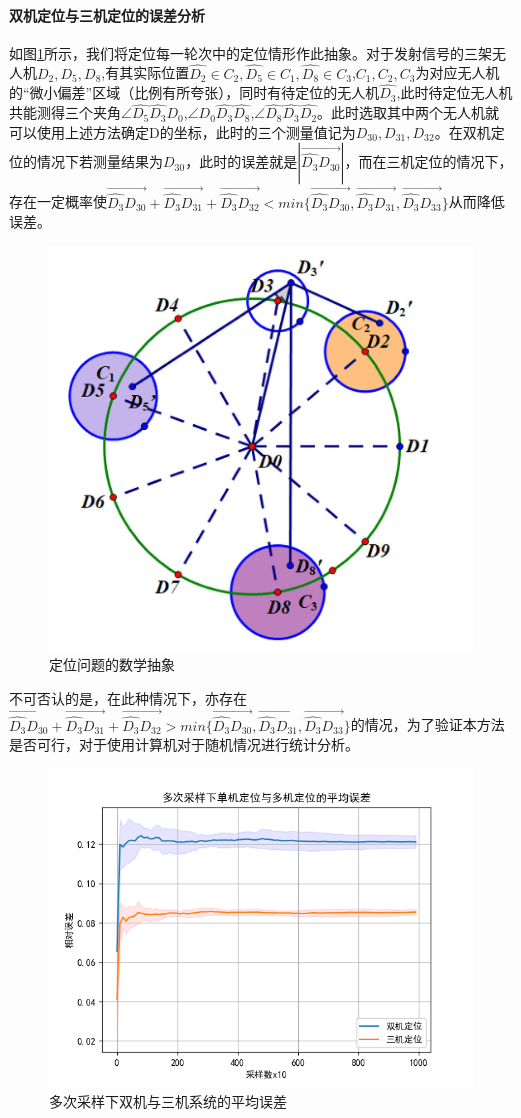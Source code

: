 \documentclass[withoutpreface,bwprint]{cumcmthesis} %
\begin{document}
			\paragraph{双机定位与三机定位的误差分析}
			如图\ref{fig16}所示，我们将定位每一轮次中的定位情形作此抽象。对于发射信号的三架无人机$D_2,D_5,D_8$,有其实际位置$\widehat{D_2}\in C_2,\widehat{D_5} \in C_1,\widehat{D_8}\in C_3$,$C_1,C_2,C_3$为对应无人机的“微小偏差”区域（比例有所夸张），同时有待定位的无人机$\widehat{D_3}$,此时待定位无人机共能测得三个夹角$\angle \widehat{D_5}\widehat{D_3}D_0$,$\angle D_0\widehat{D_3}\widehat{D_8}$,$\angle \widehat{D_8}\widehat{D_3}\widehat{D_2}$。此时选取其中两个无人机就可以使用上述方法确定D的坐标，此时的三个测量值记为$D_{30},D_{31},D_{32}$。在双机定位的情况下若测量结果为$D_{30}$，此时的误差就是$|\overrightarrow{\widehat{D_3}D_{30}}|$，而在三机定位的情况下，存在一定概率使$\overrightarrow{\widehat{D_3}D_{30}}+\overrightarrow{\widehat{D_3}D_{31}}+\overrightarrow{\widehat{D_3}D_{32}} < min\{\overrightarrow{\widehat{D_3}D_{30}},\overrightarrow{\widehat{D_3}D_{31}},\overrightarrow{\widehat{D_3}D_{33}}\}$从而降低误差。
			\begin{figure}[H]
				\centering
				\includegraphics[width=0.5\linewidth]{./figures/16}
				\caption{定位问题的数学抽象}
				\label{fig16}
			\end{figure}
			不可否认的是，在此种情况下，亦存在$\overrightarrow{\widehat{D_3}D_{30}}+\overrightarrow{\widehat{D_3}D_{31}}+\overrightarrow{\widehat{D_3}D_{32}} > min\{\overrightarrow{\widehat{D_3}D_{30}},\overrightarrow{\widehat{D_3}D_{31}},\overrightarrow{\widehat{D_3}D_{33}}\}$的情况，为了验证本方法是否可行，对于使用计算机对于随机情况进行统计分析。
			\begin{figure}[H]
				\centering
				\includegraphics[width=0.75\linewidth]{./figures/15}
				\caption{多次采样下双机与三机系统的平均误差}
				\label{fig15}
			\end{figure}
\end{document}
